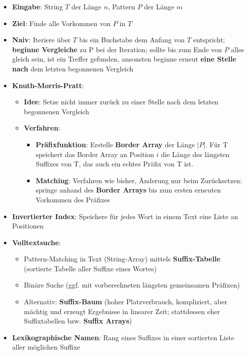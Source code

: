 \begin{itemize}
	\item \textbf{Eingabe}: String $T$ der Länge $n$, Pattern $P$ der Länge $m$
	\item \textbf{Ziel}: Finde alle Vorkommen von $P$ in $T$
	\item \textbf{Naiv}: Iteriere über $T$ bis ein Buchstabe dem Anfang von $T$ entspricht; \textbf{beginne Vergleiche} zu P bei der Iteration; sollte bis zum Ende von $P$ alles gleich sein, ist ein Treffer gefunden, ansonsten beginne erneut \textbf{eine Stelle nach} dem letzten begonnenen Vergleich
	\item \textbf{Knuth-Morris-Pratt}:
	\begin{itemize}
		\item \textbf{Idee}: Setze nicht immer zurück zu einer Stelle nach dem letzten begonnenen Vergleich
		\item \textbf{Verfahren}:
		\begin{itemize}
			\item \textbf{Präfixfunktion}: Erstelle \textbf{Border Array} der Länge $|P|$. Für T speichert das Border Array an Position $i$ die Länge des längsten Suffixes von T, das auch ein echtes Präfix von T ist.
			\item \textbf{Matching}: Verfahren wie bisher, Änderung nur beim Zurücksetzen: springe anhand des \textbf{Border Arrays} bis zum ersten erneuten Vorkommen des Präfixes
		\end{itemize}
	\end{itemize}
	\item \textbf{Invertierter Index}: Speichere für jedes Wort in einem Text eine Liste an Positionen
	\newpage
	\item \textbf{Volltextsuche}:
	\begin{itemize}
		\item Pattern-Matching in Text (String-Array) mittels \textbf{Suffix-Tabelle} (sortierte Tabelle aller Suffixe eines Wortes)
		\item Binäre Suche (ggf. mit vorberechneten längsten gemeinsamen Präfixen)
		\item Alternativ: \textbf{Suffix-Baum} (hoher Platzverbrauch, kompliziert, aber mächtig und erzeugt Ergebnisse in linearer Zeit; stattdessen eher Suffixtabellen bzw. \textbf{Suffix Arrays})
	\end{itemize}
	\item \textbf{Lexikographische Namen}: Rang eines Suffixes in einer sortierten Liste aller möglichen Suffixe
\end{itemize}


